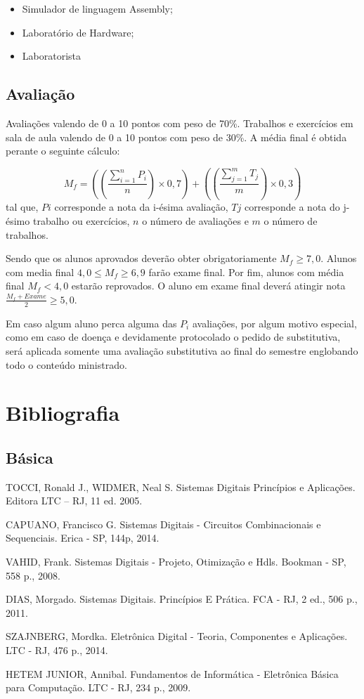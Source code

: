 \documentclass[12pt,consuni]{uftex2}
\begin{document}
\begin{itemize}
\item Simulador de linguagem Assembly;
\item Laboratório de Hardware;
\item Laboratorista
\end{itemize}

\section{Avaliação}

Avaliações valendo de 0 a 10 pontos com peso de 70\%. Trabalhos e exercícios em sala de aula valendo de 0 a 10 pontos com peso de 30\%. A média final é obtida perante o seguinte cálculo:

\[
M_f= \left( \left( \frac{ \sum_{i=1}^{n} P_i }{n} \right) \times 0,7 \right)+
     \left( \left( \frac{ \sum_{j=1}^{m} T_j }{m} \right) \times 0,3 \right)
\]
tal que, $Pi$ corresponde a nota da i-ésima avaliação, $Tj$ corresponde a nota do j-ésimo trabalho ou exercícios, $n$ o número de avaliações e $m$ o número de trabalhos.

Sendo que os alunos aprovados deverão obter obrigatoriamente $M_f \geq 7,0$. Alunos com media final $4,0 \leq M_f \geq 6,9$ farão exame final. Por fim, alunos com média final $M_f<4,0$ estarão reprovados. O aluno em exame final deverá atingir nota $\frac{M_f+Exame}{2}\geq 5,0$.

Em caso algum aluno perca alguma das $P_i$ avaliações, por algum motivo especial, como em caso de doença e devidamente protocolado o pedido de substitutiva, será aplicada somente uma avaliação substitutiva ao final do semestre englobando todo o conteúdo ministrado.

\chapter{Bibliografia}

\section{Básica}
\begin{enumerate}
\item TOCCI, Ronald J., WIDMER, Neal S. Sistemas Digitais Princípios e Aplicações. Editora LTC – RJ, 11 ed. 2005.
{\color{red} \item CAPUANO, Francisco G. Sistemas Digitais - Circuitos Combinacionais e Sequenciais. Erica - SP, 144p, 2014.
\item VAHID, Frank. Sistemas Digitais - Projeto, Otimização e Hdls. Bookman - SP, 558 p., 2008.
\item DIAS, Morgado. Sistemas Digitais. Princípios E Prática. FCA - RJ, 2 ed., 506 p., 2011.
\item SZAJNBERG, Mordka. Eletrônica Digital - Teoria, Componentes e Aplicações. LTC - RJ, 476 p., 2014.
\item HETEM JUNIOR, Annibal. Fundamentos de Informática - Eletrônica Básica para Computação. LTC - RJ, 234 p., 2009.}
\end{enumerate}
\end{document}
